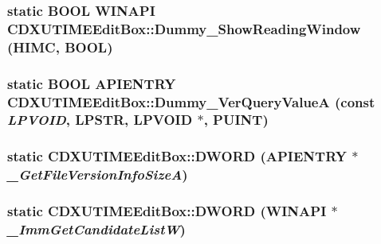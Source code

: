 \label{class_c_d_x_u_t_i_m_e_edit_box_a5795f61c3458a7f260e6af8a874cc509}
\hypertarget{class_c_d_x_u_t_i_m_e_edit_box_acf63c3fc67325d84c868546f4fa45a48}{
\subsubsection[{Dummy\_\-ShowReadingWindow}]{\setlength{\rightskip}{0pt plus 5cm}static {\bf BOOL} WINAPI CDXUTIMEEditBox::Dummy\_\-ShowReadingWindow ({\bf HIMC}, \/  {\bf BOOL})}}
\label{class_c_d_x_u_t_i_m_e_edit_box_acf63c3fc67325d84c868546f4fa45a48}
\hypertarget{class_c_d_x_u_t_i_m_e_edit_box_af205e8fd2967b53c64f9a1d9a9436130}{
\subsubsection[{Dummy\_\-VerQueryValueA}]{\setlength{\rightskip}{0pt plus 5cm}static {\bf BOOL} APIENTRY CDXUTIMEEditBox::Dummy\_\-VerQueryValueA (const  {\em LPVOID}, \/  {\bf LPSTR}, \/  {\bf LPVOID} $\ast$, \/  {\bf PUINT})}}
\label{class_c_d_x_u_t_i_m_e_edit_box_af205e8fd2967b53c64f9a1d9a9436130}
\hypertarget{class_c_d_x_u_t_i_m_e_edit_box_a69382519044b224504e511141bcaeae3}{
\subsubsection[{DWORD}]{\setlength{\rightskip}{0pt plus 5cm}static {\bf CDXUTIMEEditBox::DWORD} (APIENTRY $\ast$ {\em \_\-GetFileVersionInfoSizeA})}}
\label{class_c_d_x_u_t_i_m_e_edit_box_a69382519044b224504e511141bcaeae3}
\hypertarget{class_c_d_x_u_t_i_m_e_edit_box_a6e59c0aeb1b6cd02eb08437d5996a1c0}{
\subsubsection[{DWORD}]{\setlength{\rightskip}{0pt plus 5cm}static {\bf CDXUTIMEEditBox::DWORD} (WINAPI $\ast$ {\em \_\-ImmGetCandidateListW})}}
